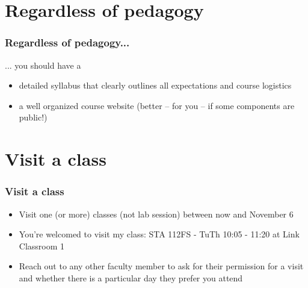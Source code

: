 \documentclass{beamer}
\begin{document}

\section{Regardless of pedagogy}


\begin{frame}
\frametitle{Regardless of pedagogy...}

... you should have a

\begin{itemize}

\item detailed syllabus that clearly outlines all expectations and course logistics

\item a well organized course website (better -- for you -- if some components are public!) 

\end{itemize}

\end{frame}


\section{Visit a class}


\begin{frame}
\frametitle{Visit a class}

\begin{itemize}

\item Visit one (or more) classes (not lab session) between now and November 6

\item You're welcomed to visit my class: STA 112FS - TuTh 10:05 - 11:20 at Link Classroom 1

\item Reach out to any other faculty member to ask for their permission for a visit and whether there is a particular day they prefer you attend

\end{itemize}

\end{frame}

\end{document}
